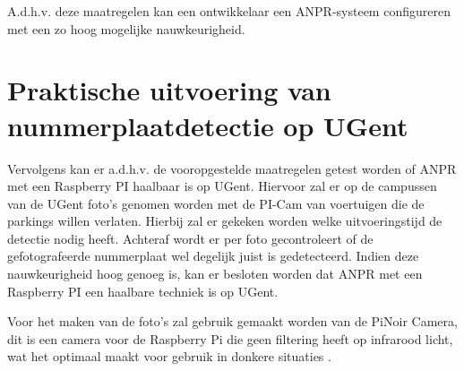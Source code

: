 A.d.h.v. deze maatregelen kan een ontwikkelaar een ANPR-systeem configureren met een zo hoog mogelijke nauwkeurigheid. 

\section{Praktische uitvoering van nummerplaatdetectie op UGent}
Vervolgens kan er a.d.h.v. de vooropgestelde maatregelen getest worden of ANPR met een Raspberry PI haalbaar is op UGent. Hiervoor zal er op de campussen van de UGent foto's genomen worden met de PI-Cam van voertuigen die de parkings willen verlaten. Hierbij zal er gekeken worden welke uitvoeringstijd de detectie nodig heeft. Achteraf wordt er per foto gecontroleert of de gefotografeerde nummerplaat wel degelijk juist is gedetecteerd. Indien deze nauwkeurigheid hoog genoeg is, kan er besloten worden dat ANPR met een Raspberry PI een haalbare techniek is op UGent.

Voor het maken van de foto's zal gebruik gemaakt worden van de PiNoir Camera, dit is een camera voor de Raspberry Pi die geen filtering heeft op infrarood licht, wat het optimaal maakt voor gebruik in donkere situaties \autocite{raspberrypisitemodelpinoir}.